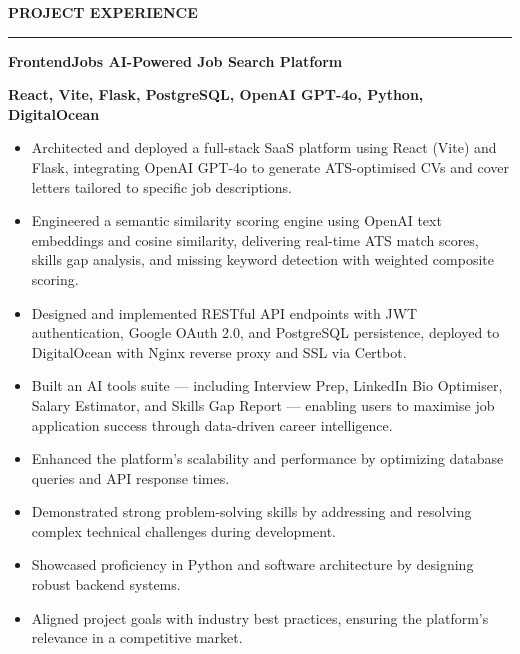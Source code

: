 \documentclass[11pt, a4paper]{article}
\newcommand{\cvsection}[1]{%
  \vspace{6pt}%
  \noindent%
  \colorbox{DKGreen}{\hspace{4pt}\rule{0pt}{14pt}\hspace{4pt}}%
  \colorbox{CardBG}{%
    \parbox[c][14pt]{\dimexpr\linewidth-16pt\relax}{%
      \hspace{8pt}\textcolor{DKGreen}{\textbf{\large\MakeUppercase{#1}}}%
    }%
  }%
  \par
  \noindent{\color{BorderClr}\rule{\linewidth}{0.6pt}}%
  \vspace{4pt}\par\noindent%
}
\begin{document}
\newpage

\cvsection{Project Experience}

\vspace{8pt}
\noindent%
{\color{DKGreen}\rule{4pt}{14pt}}\hspace{6pt}%
\textcolor{DarkTxt}{\textbf{\large FrontendJobs AI-Powered Job Search Platform}}\par
\vspace{1pt}
\noindent\hspace{10pt}\textcolor{DKGreen}{\textbf{\small React, Vite, Flask, PostgreSQL, OpenAI GPT-4o, Python, DigitalOcean}}
\vspace{2pt}
\begin{itemize}
  \item \textcolor{MidTxt}{Architected and deployed a full-stack SaaS platform using React (Vite) and Flask, integrating OpenAI GPT-4o to generate ATS-optimised CVs and cover letters tailored to specific job descriptions.}
  \item \textcolor{MidTxt}{Engineered a semantic similarity scoring engine using OpenAI text embeddings and cosine similarity, delivering real-time ATS match scores, skills gap analysis, and missing keyword detection with weighted composite scoring.}
  \item \textcolor{MidTxt}{Designed and implemented RESTful API endpoints with JWT authentication, Google OAuth 2.0, and PostgreSQL persistence, deployed to DigitalOcean with Nginx reverse proxy and SSL via Certbot.}
  \item \textcolor{MidTxt}{Built an AI tools suite — including Interview Prep, LinkedIn Bio Optimiser, Salary Estimator, and Skills Gap Report — enabling users to maximise job application success through data-driven career intelligence.}
  \item \textcolor{MidTxt}{Enhanced the platform's scalability and performance by optimizing database queries and API response times.}
  \item \textcolor{MidTxt}{Demonstrated strong problem-solving skills by addressing and resolving complex technical challenges during development.}
  \item \textcolor{MidTxt}{Showcased proficiency in Python and software architecture by designing robust backend systems.}
  \item \textcolor{MidTxt}{Aligned project goals with industry best practices, ensuring the platform's relevance in a competitive market.}
\end{itemize}
\vspace{2pt}
\end{document}
